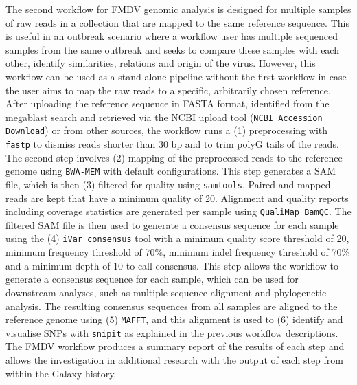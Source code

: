 The second workflow for \ac{FMDV} genomic analysis is designed for multiple samples of raw reads in a collection that are mapped to the same reference sequence. This is useful in an outbreak scenario where a workflow user has multiple sequenced samples from the same outbreak and seeks to compare these samples with each other, identify similarities, relations and origin of the virus. However, this workflow can be used as a stand-alone pipeline without the first workflow in case the user aims to map the raw reads to a specific, arbitrarily chosen reference. After uploading the reference sequence in FASTA format, identified from the megablast search and retrieved via the \ac{NCBI} upload tool (\texttt{NCBI Accession Download}) or from other sources, the workflow runs a (1) preprocessing with \texttt{fastp} to dismiss reads shorter than 30 bp and to trim polyG tails of the reads. The second step involves (2) mapping of the preprocessed reads to the reference genome using \texttt{BWA-MEM} with default configurations. This step generates a \ac{SAM} file, which is then (3) filtered for quality using \texttt{samtools}. Paired and mapped reads are kept that have a minimum quality of 20. Alignment and quality reports including coverage statistics are generated per sample using \texttt{QualiMap BamQC}. The filtered \ac{SAM} file is then used to generate a consensus sequence for each sample using the (4) \texttt{iVar consensus} tool with a minimum quality score threshold of 20, minimum frequency threshold of 70\%, minimum indel frequency threshold of 70\% and a minimum depth of 10 to call consensus. This step allows the workflow to generate a consensus sequence for each sample, which can be used for downstream analyses, such as multiple sequence alignment and phylogenetic analysis. The resulting consensus sequences from all samples are aligned to the reference genome using (5) \texttt{\acs{MAFFT}}, and this alignment is used to (6) identify and visualise \acp{SNP} with \texttt{snipit} as explained in the previous workflow descriptions. The \ac{FMDV} workflow produces a summary report of the results of each step and allows the investigation in additional research with the output of each step from within the Galaxy history. 
